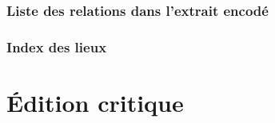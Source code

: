 \documentclass[12pt, a4paper]{article}
\begin{document}
        \subsubsection{Liste des relations dans l'extrait encodé}
         \begin{itemize} \end{itemize} 
        
        \subsubsection{Index des lieux}
        \begin{itemize}\end{itemize}
                \pagebreak
            
            
            
            \section{Édition critique}
            \beginnumbering
            \linenumbers
            \pstart    
            
            
            \pend
            \endnumbering
            
            \pagebreak
            \tableofcontents
            
\end{document}
